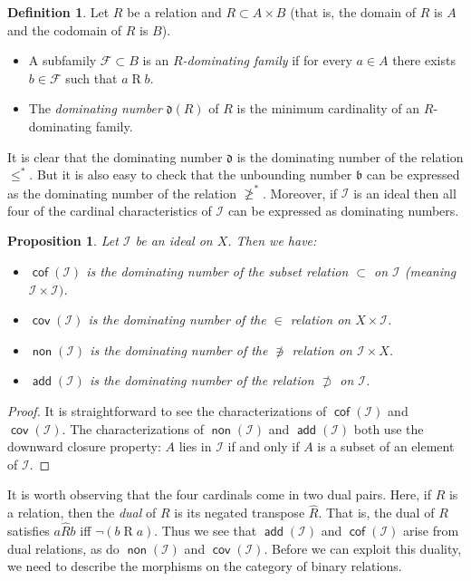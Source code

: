 \documentclass[11pt,oneside]{amsbook}
\DeclareMathOperator{\add}{\mathsf{add}}
\DeclareMathOperator{\non}{\mathsf{non}}
\DeclareMathOperator{\cov}{\mathsf{cov}}
\DeclareMathOperator{\cof}{\mathsf{cof}}
\theoremstyle{definition}
\theoremstyle{plain}
\newtheorem{prop}[thm]{Proposition}
\theoremstyle{definition}
\newtheorem{defn}[thm]{Definition}
\theoremstyle{remark}
\begin{document}
\begin{defn}
  Let $R$ be a relation and $R\subset A\times B$ (that is, the domain of $R$ is $A$ and the codomain of $R$ is $B$).
  \begin{itemize}
  \item A subfamily $\mathcal F\subset B$ is an \emph{$R$-dominating family} if for every $a\in A$ there exists $b\in\mathcal F$ such that $a\mathrel{R}b$.
  \item The \emph{dominating number} $\mathfrak d(R)$ of $R$ is the minimum cardinality of an $R$-dominating family.
  \end{itemize}
\end{defn}

It is clear that the dominating number $\mathfrak d$ is the dominating number of the relation $\leq^*$. But it is also easy to check that the unbounding number $\mathfrak b$ can be expressed as the dominating number of the relation $\not\geq^*$. Moreover, if $\mathcal I$ is an ideal then all four of the cardinal characteristics of $\mathcal I$ can be expressed as dominating numbers.

\begin{prop}
  Let $\mathcal I$ be an ideal on $X$. Then we have:
  \begin{itemize}
  \item $\cof(\mathcal I)$ is the dominating number of the subset relation $\subset$ on $\mathcal I$ (meaning $\mathcal I\times\mathcal I)$.
  \item $\cov(\mathcal I)$ is the dominating number of the $\in$ relation on $X\times\mathcal I$.
  \item $\non(\mathcal I)$ is the dominating number of the $\not\ni$ relation on $\mathcal I\times X$.
  \item $\add(\mathcal I)$ is the dominating number of the relation $\not\supset$ on $\mathcal I$.
  \end{itemize}
\end{prop}

\begin{proof}
  It is straightforward to see the characterizations of $\cof(\mathcal I)$ and $\cov(\mathcal I)$. The characterizations of $\non(\mathcal I)$ and $\add(\mathcal I)$ both use the downward closure property: $A$ lies in $\mathcal I$ if and only if $A$ is a subset of an element of $\mathcal I$.
\end{proof}

It is worth observing that the four cardinals come in two dual pairs. Here, if $R$ is a relation, then the \emph{dual} of $R$ is its negated transpose $\hat{R}$. That is, the dual of $R$ satisfies $a\mathrel{\hat{R}}b$ iff $\neg(b\mathrel Ra)$. Thus we see that $\add(\mathcal I)$ and $\cof(\mathcal I)$ arise from dual relations, as do $\non(\mathcal I)$ and $\cov(\mathcal I)$. Before we can exploit this duality, we need to describe the morphisms on the category of binary relations.
\end{document}
